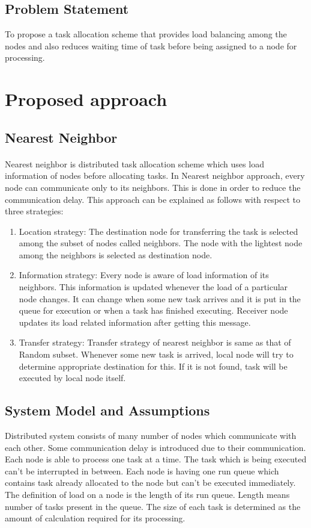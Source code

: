 \documentclass[12pt]{article}
\begin{document}
\subsection{Problem Statement}
To propose a task allocation scheme that provides load balancing among the nodes and also reduces waiting time of task before being assigned to a node for processing.

\section{Proposed approach}
\subsection{Nearest Neighbor}
\paragraph{}
Nearest neighbor is distributed task allocation scheme which uses load information of nodes before allocating tasks. In Nearest neighbor approach, every node can communicate only to its neighbors. This is done in order to reduce the communication delay. This approach can be explained as follows with respect to three strategies:
\begin{enumerate}
  \item Location strategy: The destination node for transferring the task is selected among the subset of nodes called neighbors. The node with the lightest node among the neighbors is selected as destination node.
  \item Information strategy: Every node is aware of load information of its neighbors. This information is updated whenever the load of a particular node changes. It can change when some new task arrives and it is put in the queue for execution or when a task has finished executing. Receiver node updates its load related information after getting this message.
  \item Transfer strategy: Transfer strategy of nearest neighbor is same as that of Random subset. Whenever some new task is arrived, local node will try to determine appropriate destination for this. If it is not found, task will be executed by local node itself.
\end{enumerate}

\subsection{System Model and Assumptions}
Distributed system consists of many number of nodes which communicate with each other. Some communication delay is introduced due to their communication. Each node is able to process one task at a time. The task which is being executed can’t be interrupted in between. Each node is having one run queue which contains task already allocated to the node but can’t be executed immediately. The definition of load on a node is the length of its run queue. Length means number of tasks present in the queue. The size of each task is determined as the amount of calculation required for its processing.
\end{document}
